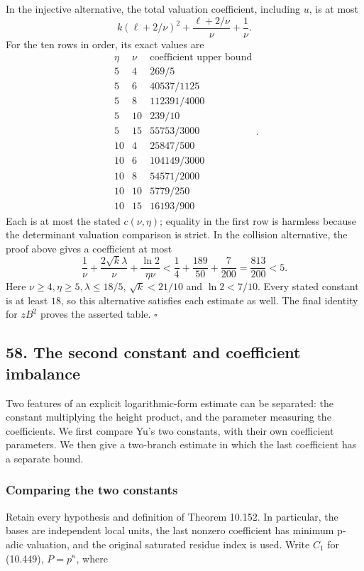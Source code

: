 \documentclass[
  11pt,
  a4paper,
]{article}
\begin{document}
In the injective alternative, the total valuation coefficient, including
\(u\), is at most \[
k(\ell+2/\nu)^2+\frac{\ell+2/\nu}{\nu}+\frac1\nu.
\tag{10.638}
\] For the ten rows in order, its exact values are \[
\begin{array}{cc|r}
\eta&\nu&\text{coefficient upper bound}\\ \hline
5&4&269/5\\
5&6&40537/1125\\
5&8&112391/4000\\
5&10&239/10\\
5&15&55753/3000\\
10&4&25847/500\\
10&6&104149/3000\\
10&8&54571/2000\\
10&10&5779/250\\
10&15&16193/900
\end{array}.
\tag{10.639}
\] Each is at most the stated \(c(\nu,\eta)\); equality in the first row
is harmless because the determinant valuation comparison is strict. In
the collision alternative, the proof above gives a coefficient at most
\[
\frac1\nu+\frac{2\sqrt{k}\lambda}{\nu}
\mathbin{+}\frac{\ln2}{\eta\nu}
<\frac14+\frac{189}{50}+\frac7{200}
=\frac{813}{200}<5.
\tag{10.640}
\] Here \(\nu\ge4,\eta\ge5,\lambda\le18/5\), \(\sqrt{k}<21/10\) and
\(\ln2<7/10\). Every stated constant is at least \(18\), so this
alternative satisfies each estimate as well. The final identity for
\(zB^2\) proves the asserted table. \(\square\)

\subsection{58. The second constant and coefficient
imbalance}\label{the-second-constant-and-coefficient-imbalance}

Two features of an explicit logarithmic-form estimate can be separated:
the constant multiplying the height product, and the parameter measuring
the coefficients. We first compare Yu's two constants, with their own
coefficient parameters. We then give a two-branch estimate in which the
last coefficient has a separate bound.

\subsubsection{Comparing the two
constants}\label{comparing-the-two-constants}

Retain every hypothesis and definition of Theorem 10.152. In particular,
the bases are independent local units, the last nonzero coefficient has
minimum p-adic valuation, and the original saturated residue index is
used. Write \(C_1\) for (10.449), \(P=p^\kappa\), where
\end{document}

